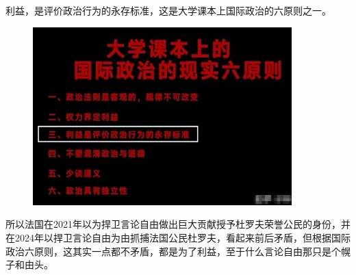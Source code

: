 \documentclass[UTF8,11pt,oneside]{ctexart}
\begin{document}
利益，是评价政治行为的永存标准，这是大学课本上国际政治的六原则之一。

\begin{figure}[H]
    \centering
    \includegraphics[width=10cm]{2024-08-28-007.jpg}
\end{figure}

所以法国在2021年以为捍卫言论自由做出巨大贡献授予杜罗夫荣誉公民的身份，并在2024年以捍卫言论自由为由抓捕法国公民杜罗夫，看起来前后矛盾，但根据国际政治六原则，这其实一点都不矛盾，都是为了利益，至于什么言论自由那只是个幌子和由头。



\end{document}
